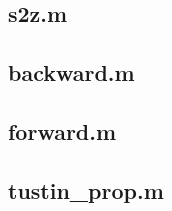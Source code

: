     \subsection*{s2z.m}
    \label{subsec:s2z}
    
    
    \subsection*{backward.m}
    \label{subsec:backward}
    
    
    \subsection*{forward.m}
    \label{subsec:forward}
    
    
    \subsection*{tustin\_prop.m}
    \label{subsec:tustin}
    